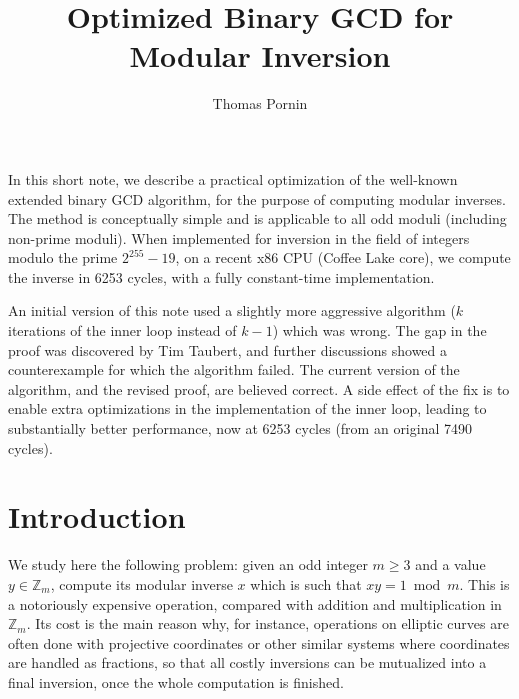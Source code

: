 \documentclass{llncs}
\makeatletter
\renewenvironment{abstract}{%
      \list{}{\advance\topsep by0.35cm\relax\small
      \leftmargin=1cm
      \labelwidth=\z@
      \listparindent=\z@
      \itemindent\listparindent
      \rightmargin\leftmargin}\item[\hskip\labelsep
                                    \textsf{\textbf{\abstractname}}]}
    {\endlist}
\newenvironment{extranote}{%
      \list{}{\advance\topsep by0.35cm\relax\small
      \leftmargin=1cm
      \labelwidth=\z@
      \listparindent=\z@
      \itemindent\listparindent
      \rightmargin\leftmargin}\item[\hskip\labelsep
                                    \textsf{\textbf{Note.}}]}
    {\endlist}
\newcommand{\bZ}{\mathbb{Z}}
\makeatother
\begin{document}
\title{\textsf{Optimized Binary GCD for Modular Inversion}}

\author{Thomas Pornin}

\maketitle
\noindent{} %

\begin{abstract}
In this short note, we describe a practical optimization of the
well-known extended binary GCD algorithm, for the purpose of computing
modular inverses. The method is conceptually simple and is applicable
to all odd moduli (including non-prime moduli). When implemented
for inversion in the field of integers modulo the prime $2^{255}-19$, on
a recent x86 CPU (Coffee Lake core), we compute the inverse in 6253
cycles, with a fully constant-time implementation.
\end{abstract}

\begin{extranote}
An initial version of this note used a slightly more aggressive
algorithm ($k$ iterations of the inner loop instead of $k-1$) which was
wrong. The gap in the proof was discovered by Tim Taubert, and further
discussions showed a counterexample for which the algorithm failed.
The current version of the algorithm, and the revised proof, are believed
correct. A side effect of the fix is to enable extra optimizations in
the implementation of the inner loop, leading to substantially better
performance, now at 6253 cycles (from an original 7490 cycles).
\end{extranote}

\section{Introduction}\label{sec:intro}

We study here the following problem: given an odd integer $m \geq 3$ and
a value $y \in \bZ_m$, compute its modular inverse $x$ which is such
that $xy = 1 \bmod m$. This is a notoriously expensive operation,
compared with addition and multiplication in $\bZ_m$. Its cost is the
main reason why, for instance, operations on elliptic curves are often
done with projective coordinates or other similar systems where
coordinates are handled as fractions, so that all costly inversions can
be mutualized into a final inversion, once the whole computation is
finished.
\end{document}
